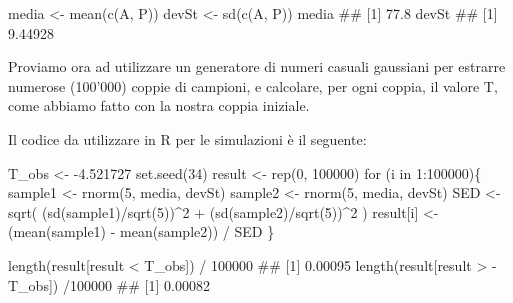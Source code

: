 \documentclass[a4paper,12pt,oneside]{book}
\newenvironment{Shaded}{}{}
\newcommand{\KeywordTok}[1]{#1}
\newcommand{\DecValTok}[1]{#1}
\newcommand{\FloatTok}[1]{#1}
\newcommand{\StringTok}[1]{#1}
\newcommand{\CommentTok}[1]{#1}
\newcommand{\ControlFlowTok}[1]{#1}
\newcommand{\OperatorTok}[1]{#1}
\newcommand{\NormalTok}[1]{#1}
\begin{document}
\begin{Shaded}
\begin{Highlighting}[]
\NormalTok{media <-}\StringTok{ }\KeywordTok{mean}\NormalTok{(}\KeywordTok{c}\NormalTok{(A, P))}
\NormalTok{devSt <-}\StringTok{ }\KeywordTok{sd}\NormalTok{(}\KeywordTok{c}\NormalTok{(A, P))}
\NormalTok{media}
\CommentTok{## [1] 77.8}
\NormalTok{devSt}
\CommentTok{## [1] 9.44928}
\end{Highlighting}
\end{Shaded}

Proviamo ora ad utilizzare un generatore di numeri casuali gaussiani per estrarre numerose (100'000) coppie di campioni, e calcolare, per ogni coppia, il valore T, come abbiamo fatto con la nostra coppia iniziale.

Il codice da utilizzare in R per le simulazioni è il seguente:

\begin{Shaded}
\begin{Highlighting}[]
\NormalTok{T_obs <-}\StringTok{ }\FloatTok{-4.521727}
\KeywordTok{set.seed}\NormalTok{(}\DecValTok{34}\NormalTok{)}
\NormalTok{result <-}\StringTok{ }\KeywordTok{rep}\NormalTok{(}\DecValTok{0}\NormalTok{, }\DecValTok{100000}\NormalTok{)}
\ControlFlowTok{for}\NormalTok{ (i }\ControlFlowTok{in} \DecValTok{1}\OperatorTok{:}\DecValTok{100000}\NormalTok{)\{}
\NormalTok{  sample1 <-}\StringTok{ }\KeywordTok{rnorm}\NormalTok{(}\DecValTok{5}\NormalTok{, media, devSt)}
\NormalTok{  sample2 <-}\StringTok{ }\KeywordTok{rnorm}\NormalTok{(}\DecValTok{5}\NormalTok{, media, devSt)}
\NormalTok{  SED <-}\StringTok{ }\KeywordTok{sqrt}\NormalTok{( (}\KeywordTok{sd}\NormalTok{(sample1)}\OperatorTok{/}\KeywordTok{sqrt}\NormalTok{(}\DecValTok{5}\NormalTok{))}\OperatorTok{^}\DecValTok{2} \OperatorTok{+}
\StringTok{                 }\NormalTok{(}\KeywordTok{sd}\NormalTok{(sample2)}\OperatorTok{/}\KeywordTok{sqrt}\NormalTok{(}\DecValTok{5}\NormalTok{))}\OperatorTok{^}\DecValTok{2}\NormalTok{ )}
\NormalTok{  result[i] <-}\StringTok{ }\NormalTok{(}\KeywordTok{mean}\NormalTok{(sample1) }\OperatorTok{-}\StringTok{ }\KeywordTok{mean}\NormalTok{(sample2)) }\OperatorTok{/}\StringTok{ }\NormalTok{SED}
\NormalTok{\}}

\KeywordTok{length}\NormalTok{(result[result }\OperatorTok{<}\StringTok{ }\NormalTok{T_obs]) }\OperatorTok{/}\StringTok{ }\DecValTok{100000}
\CommentTok{## [1] 0.00095}
\KeywordTok{length}\NormalTok{(result[result }\OperatorTok{>}\StringTok{ }\OperatorTok{-}\StringTok{ }\NormalTok{T_obs]) }\OperatorTok{/}\DecValTok{100000}
\CommentTok{## [1] 0.00082}
\end{Highlighting}
\end{Shaded}
\end{document}
